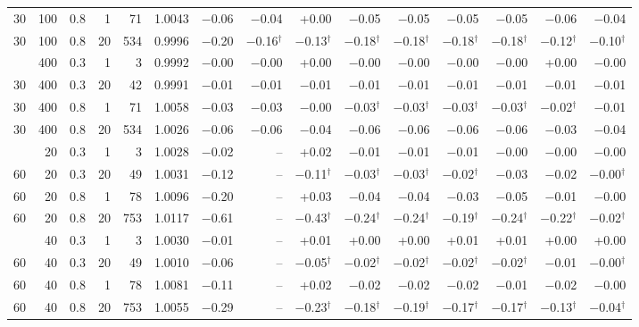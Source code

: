 \begin{tabular}{@{}rrrrr rrrrrrrrrr@{}}
30 & 100 & 0.8 & 1 & 71 & 1.0043 & $-$0.06 & $-$0.04 & +0.00 & $-$0.05 & $-$0.05 & $-$0.05 & $-$0.05 & $-$0.06 & $-$0.04 \\
30 & 100 & 0.8 & 20 & 534 & 0.9996 & $-$0.20 & $-$0.16$^{\dagger}$ & $-$0.13$^{\dagger}$ & $-$0.18$^{\dagger}$ & $-$0.18$^{\dagger}$ & $-$0.18$^{\dagger}$ & $-$0.18$^{\dagger}$ & $-$0.12$^{\dagger}$ & $-$0.10$^{\dagger}$ \\
\addlinespace[1pt]
30 & 400 & 0.3 & 1 & 3 & 0.9992 & $-$0.00 & $-$0.00 & +0.00 & $-$0.00 & $-$0.00 & $-$0.00 & $-$0.00 & +0.00 & $-$0.00 \\
30 & 400 & 0.3 & 20 & 42 & 0.9991 & $-$0.01 & $-$0.01 & $-$0.01 & $-$0.01 & $-$0.01 & $-$0.01 & $-$0.01 & $-$0.01 & $-$0.01 \\
30 & 400 & 0.8 & 1 & 71 & 1.0058 & $-$0.03 & $-$0.03 & $-$0.00 & $-$0.03$^{\dagger}$ & $-$0.03$^{\dagger}$ & $-$0.03$^{\dagger}$ & $-$0.03$^{\dagger}$ & $-$0.02$^{\dagger}$ & $-$0.01 \\
30 & 400 & 0.8 & 20 & 534 & 1.0026 & $-$0.06 & $-$0.06 & $-$0.04 & $-$0.06 & $-$0.06 & $-$0.06 & $-$0.06 & $-$0.03 & $-$0.04 \\
\addlinespace[1pt]
60 & 20 & 0.3 & 1 & 3 & 1.0028 & $-$0.02 & -- & +0.02 & $-$0.01 & $-$0.01 & $-$0.01 & $-$0.00 & $-$0.00 & $-$0.00 \\
60 & 20 & 0.3 & 20 & 49 & 1.0031 & $-$0.12 & -- & $-$0.11$^{\dagger}$ & $-$0.03$^{\dagger}$ & $-$0.03$^{\dagger}$ & $-$0.02$^{\dagger}$ & $-$0.03 & $-$0.02 & $-$0.00$^{\dagger}$ \\
60 & 20 & 0.8 & 1 & 78 & 1.0096 & $-$0.20 & -- & +0.03 & $-$0.04 & $-$0.04 & $-$0.03 & $-$0.05 & $-$0.01 & $-$0.00 \\
60 & 20 & 0.8 & 20 & 753 & 1.0117 & $-$0.61 & -- & $-$0.43$^{\dagger}$ & $-$0.24$^{\dagger}$ & $-$0.24$^{\dagger}$ & $-$0.19$^{\dagger}$ & $-$0.24$^{\dagger}$ & $-$0.22$^{\dagger}$ & $-$0.02$^{\dagger}$ \\
\addlinespace[1pt]
60 & 40 & 0.3 & 1 & 3 & 1.0030 & $-$0.01 & -- & +0.01 & +0.00 & +0.00 & +0.01 & +0.01 & +0.00 & +0.00 \\
60 & 40 & 0.3 & 20 & 49 & 1.0010 & $-$0.06 & -- & $-$0.05$^{\dagger}$ & $-$0.02$^{\dagger}$ & $-$0.02$^{\dagger}$ & $-$0.02$^{\dagger}$ & $-$0.02$^{\dagger}$ & $-$0.01 & $-$0.00$^{\dagger}$ \\
60 & 40 & 0.8 & 1 & 78 & 1.0081 & $-$0.11 & -- & +0.02 & $-$0.02 & $-$0.02 & $-$0.02 & $-$0.01 & $-$0.02 & $-$0.00 \\
60 & 40 & 0.8 & 20 & 753 & 1.0055 & $-$0.29 & -- & $-$0.23$^{\dagger}$ & $-$0.18$^{\dagger}$ & $-$0.19$^{\dagger}$ & $-$0.17$^{\dagger}$ & $-$0.17$^{\dagger}$ & $-$0.13$^{\dagger}$ & $-$0.04$^{\dagger}$ \\

\end{tabular}
